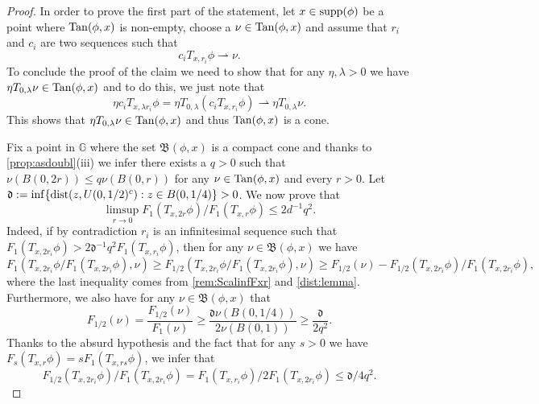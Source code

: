 \documentclass[10pt, a4paper,
oneside, headinclude,footinclude]{scrartcl}
\begin{document}
\begin{proof}
In order to prove the first part of the statement, let $x\in\operatorname*{supp}(\phi)$ be a point where $\mathrm{Tan}(\phi,x)$ is non-empty, choose a $\nu\in \mathrm{Tan}(\phi,x)$ and assume that $r_i$ and $c_i$ are two sequences such that
$$c_i T_{x,r_i}\phi\rightharpoonup \nu.$$
To conclude the proof of the claim we need to show that for any $\eta,\lambda>0$ we have $\eta T_{0,\lambda}\nu\in\mathrm{Tan}(\phi,x)$ and to do this, we just note that
$$\eta c_i T_{x,\lambda r_i} \phi=\eta T_{0,\lambda}(c_iT_{x,r_i}\phi)\rightharpoonup\eta T_{0,\lambda}\nu.$$
This shows that $\eta T_{0,\lambda}\nu\in \mathrm{Tan}(\phi,x)$ and thus $\mathrm{Tan}(\phi,x)$ is a cone.

Fix a point in $\mathbb{G}$ where the set $\mathfrak{B}(\phi,x)$ is a compact cone and thanks to \cref{prop:asdoubl}(iii) we infer there exists a $q>0$ such that $\nu(B(0,2r))\leq q\nu(B(0,r))$ for any $\nu\in\mathrm{Tan}(\phi,x)$ and every $r>0$. Let $\mathfrak{d}:=\inf\{\operatorname*{dist}(z,U(0,1/2)^c):z\in B(0,1/4)\}>0$. We now prove that
\begin{equation}\label{eqn:AgognatoLimsup}
\limsup_{r\to 0}F_1(T_{x,2r}\phi)/F_1(T_{x,r}\phi)\leq 2d^{-1}q^2.
\end{equation}
Indeed, if by contradiction $r_i$ is an infinitesimal sequence such that $F_{1}(T_{x,2r_i}\phi)> 2\mathfrak{d}^{-1}q^2 F_{1}(T_{x,r_i}\phi)$, then for any $\nu\in\mathfrak{B}(\phi,x)$ we have
\begin{equation}
    F_1(T_{x,2r_i}\phi/F_1(T_{x,2r_i}\phi),\nu)\geq F_{1/2}(T_{x,2r_i}\phi/F_1(T_{x,2r_i}\phi) ,\nu)\geq F_{1/2}(\nu)-F_{1/2}(T_{x,2r_i}\phi)/F_1(T_{x,2r_i}\phi),
    \label{eq:ineq1}
\end{equation}
where the last inequality comes from \cref{rem:ScalinfFxr} and \cref{dist:lemma}. Furthermore, we also have for any $\nu\in\mathfrak{B}(\phi,x)$ that
\begin{equation}
    F_{1/2}(\nu)=\frac{F_{1/2}(\nu)}{F_{1}(\nu)}\geq \frac{\mathfrak{d}\nu(B(0,1/4))}{2\nu(B(0,1))}\geq \frac{\mathfrak{d}}{2q^2}.
    \label{eq:ineq2}
\end{equation}
Thanks to the absurd hypothesis and the fact that for any $s>0$ we have $F_s(T_{x,r}\phi)=sF_1(T_{x,rs}\phi)$, we infer that
\begin{equation}
    F_{1/2}(T_{x,2r_i}\phi)/F_1(T_{x,2r_i}\phi)=F_{1}(T_{x,r_i}\phi)/2F_1(T_{x,2r_i}\phi)\leq \mathfrak{d}/4q^2.
    \label{eq:ineq3}
\end{equation}

\end{proof}
\end{document}
